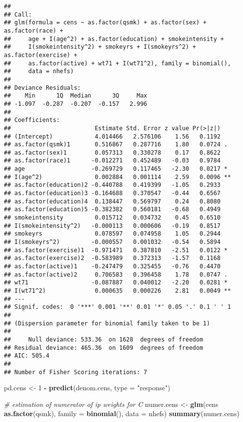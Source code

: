 \documentclass[10pt,]{book}
\newenvironment{Shaded}{\begin{snugshade}}{\end{snugshade}}
\newcommand{\CommentTok}[1]{\textcolor[rgb]{0.56,0.35,0.01}{\textit{#1}}}
\newcommand{\DataTypeTok}[1]{\textcolor[rgb]{0.13,0.29,0.53}{#1}}
\newcommand{\DecValTok}[1]{\textcolor[rgb]{0.00,0.00,0.81}{#1}}
\newcommand{\KeywordTok}[1]{\textcolor[rgb]{0.13,0.29,0.53}{\textbf{#1}}}
\newcommand{\NormalTok}[1]{#1}
\newcommand{\OperatorTok}[1]{\textcolor[rgb]{0.81,0.36,0.00}{\textbf{#1}}}
\newcommand{\StringTok}[1]{\textcolor[rgb]{0.31,0.60,0.02}{#1}}
\begin{document}
\begin{verbatim}
## 
## Call:
## glm(formula = cens ~ as.factor(qsmk) + as.factor(sex) + as.factor(race) + 
##     age + I(age^2) + as.factor(education) + smokeintensity + 
##     I(smokeintensity^2) + smokeyrs + I(smokeyrs^2) + as.factor(exercise) + 
##     as.factor(active) + wt71 + I(wt71^2), family = binomial(), 
##     data = nhefs)
## 
## Deviance Residuals: 
##    Min      1Q  Median      3Q     Max  
## -1.097  -0.287  -0.207  -0.157   2.996  
## 
## Coefficients:
##                        Estimate Std. Error z value Pr(>|z|)   
## (Intercept)            4.014466   2.576106    1.56   0.1192   
## as.factor(qsmk)1       0.516867   0.287716    1.80   0.0724 . 
## as.factor(sex)1        0.057313   0.330278    0.17   0.8622   
## as.factor(race)1      -0.012271   0.452489   -0.03   0.9784   
## age                   -0.269729   0.117465   -2.30   0.0217 * 
## I(age^2)               0.002884   0.001114    2.59   0.0096 **
## as.factor(education)2 -0.440788   0.419399   -1.05   0.2933   
## as.factor(education)3 -0.164688   0.370547   -0.44   0.6567   
## as.factor(education)4  0.138447   0.569797    0.24   0.8080   
## as.factor(education)5 -0.382382   0.560181   -0.68   0.4949   
## smokeintensity         0.015712   0.034732    0.45   0.6510   
## I(smokeintensity^2)   -0.000113   0.000606   -0.19   0.8517   
## smokeyrs               0.078597   0.074958    1.05   0.2944   
## I(smokeyrs^2)         -0.000557   0.001032   -0.54   0.5894   
## as.factor(exercise)1  -0.971471   0.387810   -2.51   0.0122 * 
## as.factor(exercise)2  -0.583989   0.372313   -1.57   0.1168   
## as.factor(active)1    -0.247479   0.325455   -0.76   0.4470   
## as.factor(active)2     0.706583   0.396458    1.78   0.0747 . 
## wt71                  -0.087887   0.040012   -2.20   0.0281 * 
## I(wt71^2)              0.000635   0.000226    2.81   0.0049 **
## ---
## Signif. codes:  0 '***' 0.001 '**' 0.01 '*' 0.05 '.' 0.1 ' ' 1
## 
## (Dispersion parameter for binomial family taken to be 1)
## 
##     Null deviance: 533.36  on 1628  degrees of freedom
## Residual deviance: 465.36  on 1609  degrees of freedom
## AIC: 505.4
## 
## Number of Fisher Scoring iterations: 7
\end{verbatim}

\begin{Shaded}
\begin{Highlighting}[]
\NormalTok{pd.cens <-}\StringTok{ }\DecValTok{1} \OperatorTok{-}\StringTok{ }\KeywordTok{predict}\NormalTok{(denom.cens, }\DataTypeTok{type =} \StringTok{"response"}\NormalTok{)}

\CommentTok{# estimation of numerator of ip weights for C}
\NormalTok{numer.cens <-}
\StringTok{  }\KeywordTok{glm}\NormalTok{(cens }\OperatorTok{~}\StringTok{ }\KeywordTok{as.factor}\NormalTok{(qsmk), }\DataTypeTok{family =} \KeywordTok{binomial}\NormalTok{(), }\DataTypeTok{data =}\NormalTok{ nhefs)}
\KeywordTok{summary}\NormalTok{(numer.cens)}
\end{Highlighting}
\end{Shaded}
\end{document}

